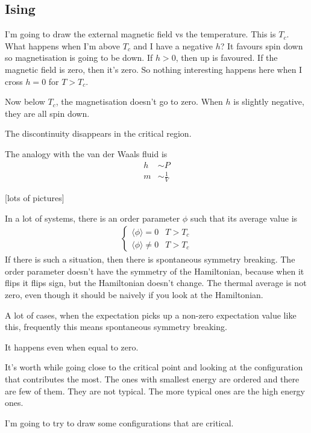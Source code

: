 \subsection{Ising}
I'm going to draw the external magnetic field vs the temperature.
This is $T_c$.
What happens when I'm above $T_c$ and I have a negative $h$?
It favours spin down so magnetisation is going to be down.
If $h>0$,
then up is favoured.
If the magnetic field is zero,
then it's zero.
So nothing interesting happens here when I cross $h=0$ for $T>T_c$.

Now below $T_c$,
the magnetisation doesn't go to zero.
When $h$ is slightly negative,
they are all spin down.

The discontinuity disappears in the critical region.

The analogy with the van der Waals fluid is
\begin{align}
    h &\sim P\\
    m &\sim \frac{1}{V}
\end{align}

[lots of pictures]

In a lot of systems,
there is an order parameter $\phi$ such that its average value is
\begin{align}
    \begin{cases}
        \langle \phi \rangle
        =
        0 & T > T_c\\
        \langle \phi \rangle
        \ne
        0 & T > T_c
    \end{cases}
\end{align}
If there is such a situation,
then there is spontaneous symmetry breaking.
The order parameter doesn't have the symmetry of the Hamiltonian,
because when it flips it flips sign,
but the Hamiltonian doesn't change.
The thermal average is not zero,
even though it should be naively if you look at the Hamiltonian.

A lot of cases,
when the expectation picks up a non-zero expectation value like this,
frequently this means spontaneous symmetry breaking.

It happens even when equal to zero.

It's worth while going close to the critical point and looking at the
configuration that contributes the most.
The ones with smallest energy are ordered and there are few of them.
They are not typical.
The more typical ones are the high energy ones.

I'm going to try to draw some configurations that are critical.

